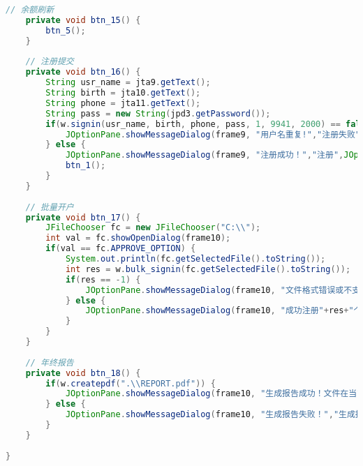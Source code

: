 \begin{lstlisting}[language = java, caption = UI.java]
	// 余额刷新
	private void btn_15() {
		btn_5();
	}
	
	// 注册提交
	private void btn_16() {
		String usr_name = jta9.getText();
		String birth = jta10.getText();
		String phone = jta11.getText();
		String pass = new String(jpd3.getPassword());
		if(w.signin(usr_name, birth, phone, pass, 1, 9941, 2000) == false) {
			JOptionPane.showMessageDialog(frame9, "用户名重复!","注册失败",2);
		} else {
			JOptionPane.showMessageDialog(frame9, "注册成功！","注册",JOptionPane.PLAIN_MESSAGE);
			btn_1();
		}
	}
	
	// 批量开户
	private void btn_17() {
		JFileChooser fc = new JFileChooser("C:\\");
		int val = fc.showOpenDialog(frame10);
		if(val == fc.APPROVE_OPTION) {
			System.out.println(fc.getSelectedFile().toString());
			int res = w.bulk_signin(fc.getSelectedFile().toString());
			if(res == -1) {
				JOptionPane.showMessageDialog(frame10, "文件格式错误或不支持xlsx格式，请使用xls格式！","文件格式错误",2);
			} else {
				JOptionPane.showMessageDialog(frame10, "成功注册"+res+"个用户！","成功",JOptionPane.PLAIN_MESSAGE);
			}
		}
	}
	
	// 年终报告
	private void btn_18() {
		if(w.createpdf(".\\REPORT.pdf")) {
			JOptionPane.showMessageDialog(frame10, "生成报告成功！文件在当前目录中。","生成报告",JOptionPane.PLAIN_MESSAGE);
		} else {
			JOptionPane.showMessageDialog(frame10, "生成报告失败！","生成报告",2);
		}
	}
	
}
\end{lstlisting}
